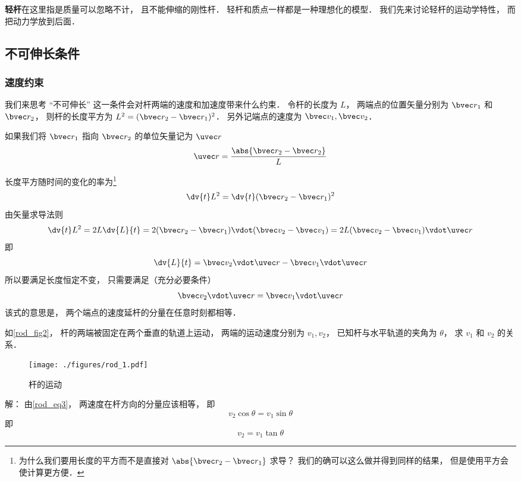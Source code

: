

\textbf{轻杆}在这里指是质量可以忽略不计， 且不能伸缩的刚性杆． 轻杆和质点一样都是一种理想化的模型． 我们先来讨论轻杆的运动学特性， 而把动力学放到后面．

\subsection{不可伸长条件}
\subsubsection{速度约束}
我们来思考 “不可伸长” 这一条件会对杆两端的速度和加速度带来什么约束． 令杆的长度为 $L$， 两端点的位置矢量分别为 $\bvec r_1$ 和 $\bvec r_2$， 则杆的长度平方为 $L^2 = (\bvec r_2 - \bvec r_1)^2$． 另外记端点的速度为 $\bvec v_1, \bvec v_2$．

如果我们将 $\bvec r_1$ 指向 $\bvec r_2$ 的单位矢量记为 $\uvec r$
\begin{equation}\label{rod_eq7}
\uvec r = \frac{\abs{\bvec r_2 - \bvec r_2}}{L}
\end{equation}

长度平方随时间的变化的率为\footnote{为什么我们要用长度的平方而不是直接对 $\abs{\bvec r_2 - \bvec r_1}$ 求导？ 我们的确可以这么做并得到同样的结果， 但是使用平方会使计算更方便．}
\begin{equation}\label{rod_eq2}
\dv{t} L^2 = \dv{t} (\bvec r_2 - \bvec r_1)^2
\end{equation}
由矢量求导法则
\begin{equation}\label{rod_eq1}
\dv{t} L^2 = 2L \dv{L}{t} = 2 (\bvec r_2 - \bvec r_1) \vdot (\bvec v_2 - \bvec v_1) = 2L (\bvec v_2 - \bvec v_1) \vdot \uvec r
\end{equation}
即
\begin{equation}\label{rod_eq6}
\dv{L}{t} = \bvec v_2 \vdot \uvec r - \bvec v_1 \vdot \uvec r
\end{equation}
所以要满足长度恒定不变， 只需要满足（充分必要条件）
\begin{equation}\label{rod_eq3}
\bvec v_2 \vdot \uvec r = \bvec v_1 \vdot \uvec r
\end{equation}
该式的意思是， 两个端点的速度延杆的分量在任意时刻都相等．

\begin{example}{}\label{rod_ex1}
如\autoref{rod_fig2}， 杆的两端被固定在两个垂直的轨道上运动， 两端的运动速度分别为 $v_1, v_2$， 已知杆与水平轨道的夹角为 $\theta$， 求 $v_1$ 和 $v_2$ 的关系．
\begin{figure}[ht]
\centering
\texttt{[image: ./figures/rod\_1.pdf]}
\caption{杆的运动} \label{rod_fig1}
\end{figure}
解： 由\autoref{rod_eq3}， 两速度在杆方向的分量应该相等， 即
\begin{equation}
v_2 \cos\theta = v_1 \sin\theta
\end{equation}
即
\begin{equation}
v_2 = v_1 \tan\theta
\end{equation}
\end{example}


